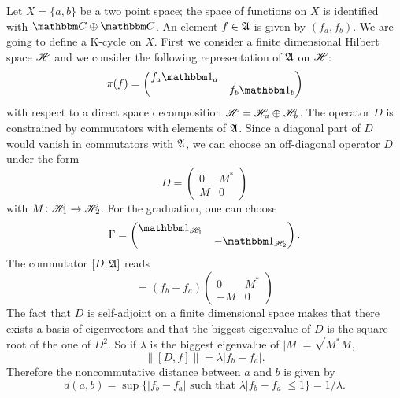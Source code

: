 Let $X=\{ a,b \}$ be a two point space; the space of functions on $X$ is identified with $\eC\oplus\eC$. An element $f\in\mathfrak{A}$ is given by $(f_a,f_b)$. We are going to define a K-cycle on $X$. First we consider a finite dimensional Hilbert space $\mathscr{H}$ and we consider the following representation of $\mathfrak{A}$ on $\mathscr{H}$:
\[ 
  \pi(f)=\begin{pmatrix}
f_a\mtu_a\\&f_b\mtu_b
\end{pmatrix}
\]
with respect to a direct space decomposition $\mathscr{H}=\mathscr{H}_a\oplus\mathscr{H}_b$. The operator $D$ is constrained by commutators with elements of $\mathfrak{A}$. Since a diagonal part of $D$ would vanish in commutators with $\mathfrak{A}$, we can choose an off-diagonal operator $D$ under the form
\begin{equation}
D=\begin{pmatrix}
0&M^*\\
M&0
\end{pmatrix}
\end{equation}
with $M\colon \mathscr{H}_1\to \mathscr{H}_2$. For the graduation, one can choose 
\[ 
  \Gamma=\begin{pmatrix}
\mtu_{\hH_1}\\
&-\mtu_{\hH_2}
\end{pmatrix}.
\]
The commutator $[D,\mathfrak{A}]$ reads
\begin{equation}
[D,f]=(f_b-f_a)\begin{pmatrix}
0&M^*\\
-M&0
\end{pmatrix}
\end{equation}
The fact that $D$ is self-adjoint on a finite dimensional space makes that there exists a basis of eigenvectors and that the biggest eigenvalue of $D$ is the square root of the one of $D^2$. So if $\lambda$ is the biggest eigenvalue of $| M |=\sqrt{M^*M}$,
\[ 
  \| [D,f] \|=\lambda|f_b-f_a|.
\]
Therefore the noncommutative distance between $a$ and $b$ is given by
\begin{equation}
d(a,b)=\sup\{ | f_b-f_a |\text{ such that } \lambda| f_b-f_a |\leq 1 \}=1/\lambda.
\end{equation}


